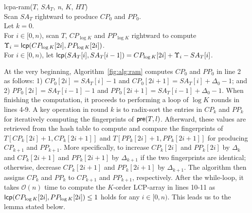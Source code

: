 \documentclass[10pt,journal,compsoc]{IEEEtran}
\begin{document}
\begin{CJK*}{GBK}{song}
\begin{algorithm}[hbtp!]
\caption{Compute $K$-Order $LCPA_T$ in RAM}
\label{fig:alg:ram}
lcpa-ram($T$, $SA_T$, {\em n}, $K$, $HT$){\\
\SetAlgoNoLine
Scan $SA_T$ rightward to produce $CP_0$ and $PP_0$. \\
Let $k = 0$. \\
\While{$k < \log K$}{
\Indentp{-1em}
Radix-sort $CP_k$ and $PP_k$ to produce $ICP_k$ and $IPP_k$. \\
For $i\in [0,n)$, scan $T$ rightward to compute the fingerprint of ${\sf pre}(T,i)$ and let $FP[0,i]=HT[i]$ if $i\in \{ICP_k[j] \cup IPP_k[j], j\in[0,2n)\}$. \\
For $i\in [0,n)$, scan $CP_k$ and $PP_k$ rightward to compute and compare $FP[CP_k[2i]+1,CP_k[2i+1]]$ and $FP[PP_k[2i]+1,PP_k[2i+1]]$ for generating $CP_{k+1}$ and $PP_{k+1}$. \\
Let $k = k +1$ and clear $HT$. \\
}
For $i\in [0,n)$, scan $T$, $CP_{\log K}$ and $PP_{\log K}$ rightward to compute $\Upsilon_i = {\sf lcp}(CP_{\log K}[2i],PP_{\log K}[2i])$. \\
For $i\in [0,n)$, let ${\sf lcp}(SA_T[i],SA_T[i-1])=CP_{\log K}[2i] +\Upsilon_i-SA_T[i]$. \\
}
\end{algorithm}

At the very beginning, Algorithm~\ref{fig:alg:ram} computes $CP_0$ and $PP_0$ in line 2 as follows: 1) $CP_0[2i]=SA_T[i]-1$ and $CP_0[2i+1]=SA_T[i]+ \Delta_0 - 1$; and 2) $PP_0[2i]=SA_T[i-1]-1$ and $PP_0[2i+1]=SA_T[i-1]+ \Delta_0 - 1$. When finishing the computation, it proceeds to performing a loop of $\log K$ rounds in lines 4-9. A key operation in round $k$ is to radix-sort the entries in $CP_k$ and $PP_k$ for iteratively computing the fingerprints of ${\sf pre}(T,l)$. Afterward, these values are retrieved from the hash table to compute and compare the fingerprints of $T[CP_k[2i]+1,CP_k[2i+1]]$ and $T [PP_k[2i]+1,PP_k[2i+1]]$ for producing $CP_{k+1}$ and $PP_{k+1}$. More specifically, to increase $CP_{k}[2i]$ and $PP_{k}[2i]$ by $\Delta_k$ and $CP_{k}[2i+1]$ and $PP_{k}[2i+1]$ by $\Delta_{k+1}$ if the two fingerprints are identical; otherwise, decrease $CP_{k}[2i+1]$ and $PP_{k}[2i+1]$ by $\Delta_{k+1}$. The algorithm then assigns $CP_k$ and $PP_k$ to $CP_{k+1}$ and $PP_{k+1}$, respectively. After the while-loop, it takes $\mathcal{O}(n)$ time to compute the $K$-order LCP-array in lines 10-11 as ${\sf lcp}(CP_{\log K}[2i],PP_{\log K}[2i]) \le 1$ holds for any $i \in [0,n)$. This leads us to the lemma stated below.


\end{CJK*}
\end{document}
